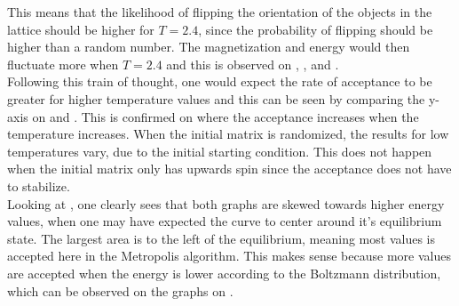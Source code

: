 \documentclass[10pt,a4paper]{article}
\begin{document}
\noindent This means that the likelihood of flipping the orientation of the objects in the lattice should be higher for $T = 2.4$, since the probability of flipping should be higher than a random number. The magnetization and energy would then fluctuate more when $T = 2.4$ and this is observed on  ,  ,  and .
\\
Following this train of thought, one would expect the rate of acceptance to be greater for higher temperature values and this can be seen by comparing the y-axis on  and . This is confirmed on  where the acceptance increases when the temperature increases. When the initial matrix is randomized, the results for low temperatures vary, due to the initial starting condition. This does not happen when the initial matrix only has upwards spin since the acceptance does not have to stabilize.
\\
Looking at , one clearly sees that both graphs are skewed towards higher energy values, when one may have expected the curve to center around it's equilibrium state. The largest area is to the left of the equilibrium, meaning most values is accepted here in the Metropolis algorithm. This makes sense because more values are accepted when the energy is lower according to the Boltzmann distribution, which can be observed on the graphs on .
\end{document}
